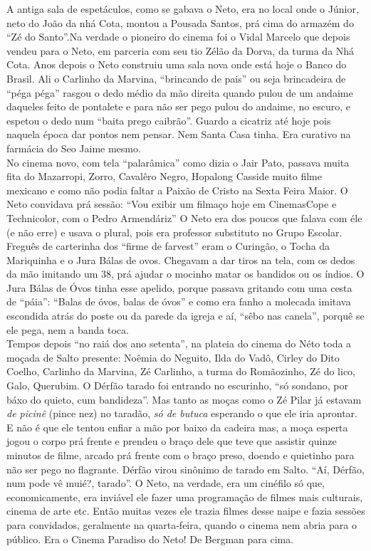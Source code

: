 \documentclass[12pt,brazil,]{book}
\begin{document}
A antiga sala de espetáculos, como se gabava o Neto, era no local onde o
Júnior, neto do João da nhá Cota, montou a Pousada Santos, prá cima do
armazém do ``Zé do Santo''.Na verdade o pioneiro do cinema foi o Vidal
Marcelo que depois vendeu para o Neto, em parceria com seu tio Zélão da
Dorva, da turma da Nhá Cota. Anos depois o Neto construiu uma sala nova
onde está hoje o Banco do Brasil. Ali o Carlinho da Marvina, ``brincando
de pais'' ou seja brincadeira de ``péga péga'' rasgou o dedo médio da
mão direita quando pulou de um andaime daqueles feito de pontalete e
para não ser pego pulou do andaime, no escuro, e espetou o dedo num
``baita prego caibrão''. Guardo a cicatriz até hoje pois naquela época
dar pontos nem pensar. Nem Santa Casa tinha. Era curativo na farmácia do
Seo Jaime mesmo.\\
No cinema novo, com tela ``palarâmica'' como dizia o Jair Pato, passava
muita fita do Mazarropi, Zorro, Cavalêro Negro, Hopalong Casside muito
filme mexicano e como não podia faltar a Paixão de Cristo na Sexta Feira
Maior. O Neto convidava prá sessão: ``Vou exibir um filmaço hoje em
CinemasCope e Technicolor, com o Pedro Armendáriz'' O Neto era dos
poucos que falava com éle (e não erre) e usava o plural, pois era
professor substituto no Grupo Escolar. Freguês de carterinha dos ``firme
de farvest'' eram o Curingão, o Tocha da Mariquinha e o Jura Bálas de
ovos. Chegavam a dar tiros na tela, com os dedos da mão imitando um 38,
prá ajudar o mocinho matar os bandidos ou os índios. O Jura Bálas de
Óvos tinha esse apelido, porque passava gritando com uma cesta de
``páia'': ``Balas de óvos, balas de óvos'' e como era fanho a molecada
imitava escondida atrás do poste ou da parede da igreja e aí, ``sêbo nas
canela'', porquê se ele pega, nem a banda toca.\\
Tempos depois ``no raiá dos ano setenta'', na plateia do cinema do Néto
toda a moçada de Salto presente: Noêmia do Neguito, Ilda do Vadô, Cirley
do Dito Coelho, Carlinho da Marvina, Zé Carlinho, a turma do Romãozinho,
Zé do lico, Galo, Querubim. O Dérfão tarado foi entrando no escurinho,
``só sondano, por báxo do quieto, cum bandideza''. Mas tanto as moças
como o Zé Pilar já estavam \emph{de picinê} (pince nez) no taradão,
\emph{só de butuca} esperando o que ele iria aprontar. E não é que ele
tentou enfiar a mão por baixo da cadeira mas, a moça esperta jogou o
corpo prá frente e prendeu o braço dele que teve que assistir quinze
minutos de filme, arcado prá frente com o braço preso, doendo e
quietinho para não ser pego no flagrante. Dérfão virou sinônimo de
tarado em Salto. ``Aí, Dérfão, num pode vê muié?, tarado''. O Neto, na
verdade, era um cinéfilo só que, economicamente, era inviável ele fazer
uma programação de filmes mais culturais, cinema de arte etc. Então
muitas vezes ele trazia filmes desse naipe e fazia sessões para
convidados, geralmente na quarta-feira, quando o cinema nem abria para o
público. Era o Cinema Paradiso do Neto! De Bergman para cima.
\end{document}
